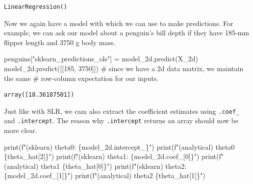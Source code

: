 \documentclass[
  letterpaper,
  DIV=11,
  numbers=noendperiod]{scrreprt}
\newenvironment{Shaded}{\begin{snugshade}}{\end{snugshade}}
\newcommand{\BuiltInTok}[1]{\textcolor[rgb]{0.00,0.23,0.31}{#1}}
\newcommand{\CommentTok}[1]{\textcolor[rgb]{0.37,0.37,0.37}{#1}}
\newcommand{\DecValTok}[1]{\textcolor[rgb]{0.68,0.00,0.00}{#1}}
\newcommand{\NormalTok}[1]{\textcolor[rgb]{0.00,0.23,0.31}{#1}}
\newcommand{\OperatorTok}[1]{\textcolor[rgb]{0.37,0.37,0.37}{#1}}
\newcommand{\SpecialCharTok}[1]{\textcolor[rgb]{0.37,0.37,0.37}{#1}}
\newcommand{\SpecialStringTok}[1]{\textcolor[rgb]{0.13,0.47,0.30}{#1}}
\newcommand{\StringTok}[1]{\textcolor[rgb]{0.13,0.47,0.30}{#1}}
\begin{document}
\begin{verbatim}
LinearRegression()
\end{verbatim}

Now we again have a model with which we can use to make predictions. For
example, we can ask our model about a penguin's bill depth if they have
185-mm flipper length and 3750 g body mass.

\begin{Shaded}
\begin{Highlighting}[]
\NormalTok{penguins[}\StringTok{"sklearn\_predictions\_ols"}\NormalTok{] }\OperatorTok{=}\NormalTok{ model\_2d.predict(X\_2d)}
\NormalTok{model\_2d.predict([[}\DecValTok{185}\NormalTok{, }\DecValTok{3750}\NormalTok{]]) }
\CommentTok{\# since we have a 2d data matrix, we maintain the same }
\CommentTok{\# row{-}column expectation for our inputs. }
\end{Highlighting}
\end{Shaded}

\begin{verbatim}
array([18.36187501])
\end{verbatim}

Just like with SLR, we cam also extract the coefficient estimates using
\texttt{.coef\_} and \texttt{.intercept}. The reason why
\texttt{.intercept} returns an array should now be more clear.

\begin{Shaded}
\begin{Highlighting}[]
\BuiltInTok{print}\NormalTok{(}\SpecialStringTok{f"(sklearn) theta0: }\SpecialCharTok{\{}\NormalTok{model\_2d}\SpecialCharTok{.}\NormalTok{intercept\_}\SpecialCharTok{\}}\SpecialStringTok{"}\NormalTok{)}
\BuiltInTok{print}\NormalTok{(}\SpecialStringTok{f"(analytical) theta0 }\SpecialCharTok{\{}\NormalTok{theta\_hat[}\DecValTok{2}\NormalTok{]}\SpecialCharTok{\}}\SpecialStringTok{"}\NormalTok{)}
\BuiltInTok{print}\NormalTok{(}\SpecialStringTok{f"(sklearn) theta1: }\SpecialCharTok{\{}\NormalTok{model\_2d}\SpecialCharTok{.}\NormalTok{coef\_[}\DecValTok{0}\NormalTok{]}\SpecialCharTok{\}}\SpecialStringTok{"}\NormalTok{)}
\BuiltInTok{print}\NormalTok{(}\SpecialStringTok{f"(analytical) theta1 }\SpecialCharTok{\{}\NormalTok{theta\_hat[}\DecValTok{0}\NormalTok{]}\SpecialCharTok{\}}\SpecialStringTok{"}\NormalTok{)}
\BuiltInTok{print}\NormalTok{(}\SpecialStringTok{f"(sklearn) theta2: }\SpecialCharTok{\{}\NormalTok{model\_2d}\SpecialCharTok{.}\NormalTok{coef\_[}\DecValTok{1}\NormalTok{]}\SpecialCharTok{\}}\SpecialStringTok{"}\NormalTok{)}
\BuiltInTok{print}\NormalTok{(}\SpecialStringTok{f"(analytical) theta2 }\SpecialCharTok{\{}\NormalTok{theta\_hat[}\DecValTok{1}\NormalTok{]}\SpecialCharTok{\}}\SpecialStringTok{"}\NormalTok{)}
\end{Highlighting}
\end{Shaded}
\end{document}
